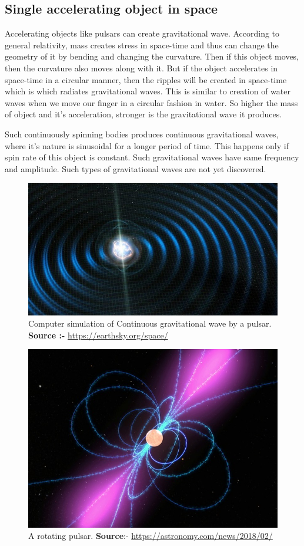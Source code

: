 \subsection{Single accelerating object in space}
 Accelerating objects like pulsars can create gravitational wave. According to general relativity, mass creates stress in space-time and thus can change the geometry of it by bending and changing the curvature. Then if this object moves, then the curvature also moves along with it. But if the object accelerates in space-time in a circular manner, then the ripples will be created in space-time which is which radiates gravitational waves. This is similar to creation of water waves when we move our finger in a circular fashion in water. So higher the mass of object and it's acceleration, stronger is the gravitational wave it produces.
 
 Such continuously spinning bodies produces continuous gravitational waves, where it's nature is sinusoidal for a longer period of time. This happens only if spin rate of this object is constant. Such gravitational waves have same frequency and amplitude. Such types of gravitational waves are not yet discovered.\\


\begin{figure}[h]
    \centering
    \includegraphics[scale = 0.33]{images.tex/continuous_gw.jpg}
    \caption{Computer simulation of Continuous gravitational wave by a pulsar. \\
    \textbf{Source :-} \url{https://earthsky.org/space/}}
\end{figure}

\begin{figure}[h]
    \centering
    \includegraphics[scale = 0.33]{images.tex/pulsar.jpg}
    \caption{A rotating pulsar.   \textbf{Source}:- \url{https://astronomy.com/news/2018/02/}}
\end{figure}

\pagebreak